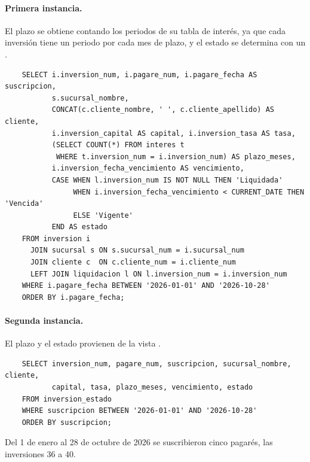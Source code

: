\paragraph{Primera instancia.} El plazo se obtiene contando los periodos de su tabla de inter\'es, ya que cada inversi\'on tiene un periodo por cada mes de plazo, y el estado se determina con un .

\begin{verbatim}
	SELECT i.inversion_num, i.pagare_num, i.pagare_fecha AS suscripcion,
	       s.sucursal_nombre,
	       CONCAT(c.cliente_nombre, ' ', c.cliente_apellido) AS cliente,
	       i.inversion_capital AS capital, i.inversion_tasa AS tasa,
	       (SELECT COUNT(*) FROM interes t
	        WHERE t.inversion_num = i.inversion_num) AS plazo_meses,
	       i.inversion_fecha_vencimiento AS vencimiento,
	       CASE WHEN l.inversion_num IS NOT NULL THEN 'Liquidada'
	            WHEN i.inversion_fecha_vencimiento < CURRENT_DATE THEN 'Vencida'
	            ELSE 'Vigente'
	       END AS estado
	FROM inversion i
	  JOIN sucursal s ON s.sucursal_num = i.sucursal_num
	  JOIN cliente c  ON c.cliente_num = i.cliente_num
	  LEFT JOIN liquidacion l ON l.inversion_num = i.inversion_num
	WHERE i.pagare_fecha BETWEEN '2026-01-01' AND '2026-10-28'
	ORDER BY i.pagare_fecha;
\end{verbatim}

\paragraph{Segunda instancia.} El plazo y el estado provienen de la vista .

\begin{verbatim}
	SELECT inversion_num, pagare_num, suscripcion, sucursal_nombre, cliente,
	       capital, tasa, plazo_meses, vencimiento, estado
	FROM inversion_estado
	WHERE suscripcion BETWEEN '2026-01-01' AND '2026-10-28'
	ORDER BY suscripcion;
\end{verbatim}

Del 1 de enero al 28 de octubre de 2026 se suscribieron cinco pagar\'es, las inversiones 36 a 40.

